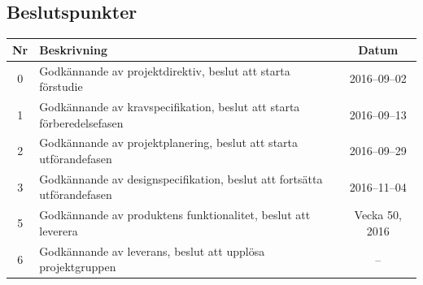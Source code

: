 \documentclass[a4paper,titlepage,12pt]{article}
\begin{document}
	
	\subsection{Beslutspunkter}
	\renewcommand*{\arraystretch}{1.4}
    \begin{longtable}[c]{ c p{} c}
		\textbf{Nr} & \textbf{Beskrivning} & \textbf{Datum} \\ \midrule
		0 & Godkännande av projektdirektiv, beslut att starta förstudie & 2016--09--02 \\ \midrule
	    1 & Godkännande av kravspecifikation, beslut att starta förberedelsefasen & 2016--09--13 \\ \midrule
		2 & Godkännande av projektplanering, beslut att starta utförandefasen & 2016--09--29 \\ \midrule
		3 & Godkännande av designspecifikation, beslut att fortsätta
		utförandefasen & 2016--11--04 \\ \midrule
		5 & Godkännande av produktens funktionalitet, beslut att
        leverera & Vecka 50, 2016 \\ \midrule
		6 & Godkännande av leverans, beslut att upplösa projektgruppen & -- \\ \midrule
	\end{longtable}
	
	
\end{document}
